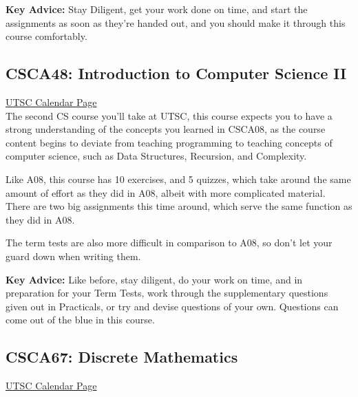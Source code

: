 \documentclass[11pt]{article}
\begin{document}
\textbf{Key Advice:} Stay Diligent, get your work done on time, and start the assignments as soon as they're handed out, and you should make it through this course comfortably.

\subsection{CSCA48: Introduction to Computer Science II}

\href{https://utsc.calendar.utoronto.ca/course/CSCA48H3}{UTSC Calendar Page}\\

The second CS course you'll take at UTSC, this course expects you to have a strong understanding of the concepts you learned in CSCA08, as the course content begins to deviate from teaching programming to teaching concepts of computer science, such as Data Structures, Recursion, and Complexity.\par
Like A08, this course has 10 exercises, and 5 quizzes, which take around the same amount of effort as they did in A08, albeit with more complicated material.  There are two big assignments this time around, which serve the same function as they did in A08.\par
The term tests are also more difficult in comparison to A08, so don't let your guard down when writing them.\par

\textbf{Key Advice:} Like before, stay diligent, do your work on time, and in preparation for your Term Tests, work through the supplementary questions given out in Practicals, or try and devise questions of your own.  Questions can come out of the blue in this course.

\subsection{CSCA67: Discrete Mathematics}

\href{https://utsc.calendar.utoronto.ca/course/CSCA67H3}{UTSC Calendar Page}\\
\end{document}
